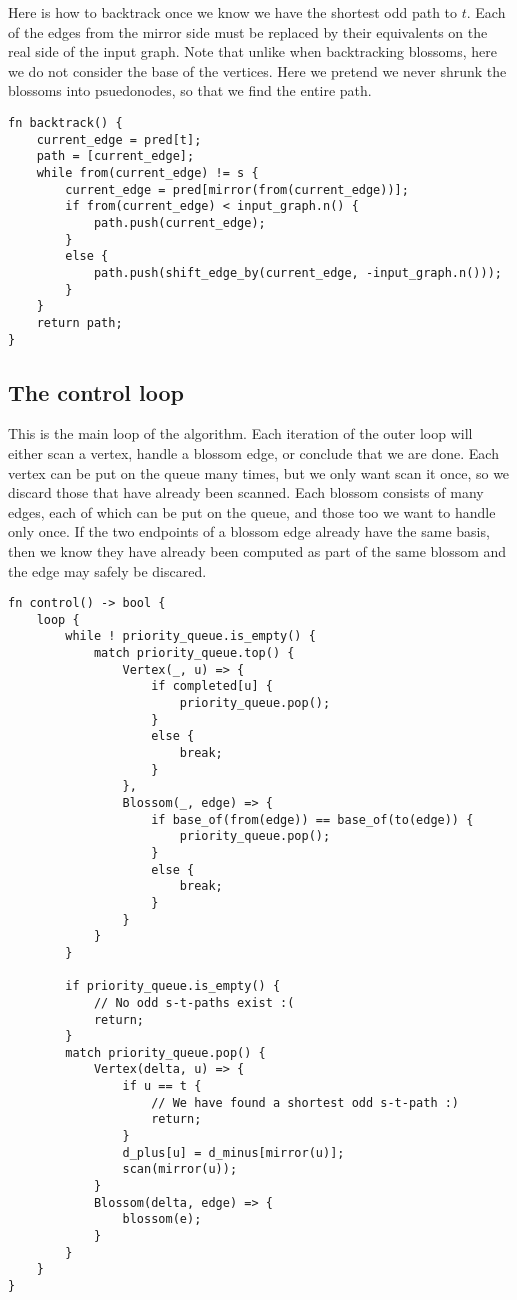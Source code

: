 Here is how to backtrack once we know we have the shortest odd path to $t$. Each of the edges from the mirror side must be replaced by their equivalents on the real side of the input graph. Note that unlike when backtracking blossoms, here we do not consider the base of the vertices. Here we pretend we never shrunk the blossoms into psuedonodes, so that we find the entire path.
\begin{lstlisting}[caption={Backtracking},label=Listing,mathescape=true]
fn backtrack() {
    current_edge = pred[t];
    path = [current_edge];
    while from(current_edge) != s {
        current_edge = pred[mirror(from(current_edge))];
        if from(current_edge) < input_graph.n() {
            path.push(current_edge);
        }
        else {
            path.push(shift_edge_by(current_edge, -input_graph.n()));
        }
    }
    return path;
}
\end{lstlisting}

\subsection{The control loop}
This is the main loop of the algorithm. Each iteration of the outer loop will either scan a vertex, handle a blossom edge, or conclude that we are done. Each vertex can be put on the queue many times, but we only want scan it once, so we discard those that have already been scanned. Each blossom consists of many edges, each of which can be put on the queue, and those too we want to handle only once. If the two endpoints of a blossom edge already have the same basis, then we know they have already been computed as part of the same blossom and the edge may safely be discared.
\begin{lstlisting}[caption={Control, the main loop},label=Listing,mathescape=true]
fn control() -> bool {
    loop {
        while ! priority_queue.is_empty() {
            match priority_queue.top() {
                Vertex(_, u) => {
                    if completed[u] {
                        priority_queue.pop();
                    }
                    else {
                        break;
                    }
                },
                Blossom(_, edge) => {
                    if base_of(from(edge)) == base_of(to(edge)) {
                        priority_queue.pop();
                    }
                    else {
                        break;
                    }
                }
            }
        }

        if priority_queue.is_empty() {
            // No odd s-t-paths exist :(
            return;
        }
        match priority_queue.pop() {
            Vertex(delta, u) => {
                if u == t {
                    // We have found a shortest odd s-t-path :)
                    return;
                }
                d_plus[u] = d_minus[mirror(u)];
                scan(mirror(u));
            }
            Blossom(delta, edge) => {
                blossom(e);
            }
        }
    }
}
\end{lstlisting}


